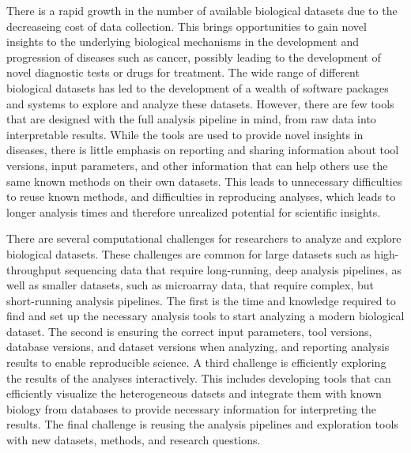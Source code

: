 There is a rapid growth in the number of available biological datasets due to
the decreaseing cost of data collection. This brings opportunities to gain novel
insights to the underlying biological mechanisms in the development and
progression of diseases such as cancer, possibly leading to the development of
novel diagnostic tests or drugs for treatment.  The wide range of different
biological datasets has led to the development of a wealth of software packages
and systems to explore and analyze these datasets.  However, there are few tools
that are designed with the full analysis pipeline in mind, from raw data into
interpretable results.  While the tools are used to provide novel insights in
diseases, there is little emphasis on reporting and sharing information about
tool versions, input parameters, and other information that can help others use
the same known methods on their own datasets.  This leads to unnecessary
difficulties to reuse known methods, and difficulties in reproducing analyses,
which leads to longer analysis times and therefore unrealized potential for
scientific insights.

There are several 
computational challenges 
for researchers to analyze
and explore biological datasets. These challenges are common for large datasets
such as high-throughput sequencing data that require long-running, deep analysis
pipelines, as well as smaller datasets, such as microarray data, that require
complex, but short-running analysis pipelines. The first is the time and
knowledge required to find and set up the necessary analysis tools to start
analyzing a modern biological dataset. The second is ensuring the correct input
parameters, tool versions, database versions, and dataset versions when
analyzing, and reporting analysis results to enable reproducible science. A
third challenge is efficiently exploring the results of the analyses
interactively. This includes developing tools that can efficiently visualize the
heterogeneous datsets and integrate them with known biology from databases to
provide necessary information for interpreting the results. The final challenge
is reusing the analysis pipelines and exploration tools with new datasets,
methods, and research questions. 

